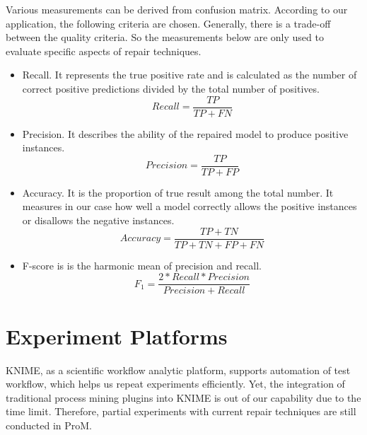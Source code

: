 Various measurements can be derived from confusion matrix. According to our application, the following criteria are chosen. Generally, there is a trade-off between the quality criteria. So the measurements below are only used to evaluate specific aspects of repair techniques.
\begin{itemize}
	\item Recall. It represents the true positive rate and is calculated as the number of correct positive predictions divided by the total number of positives.
	\[Recall = \frac{TP}{TP + FN}\]
	\item Precision. It describes the ability of the repaired model to produce positive instances.
	\[Precision = \frac{TP}{TP + FP }\]
	\item Accuracy. It is the proportion of true result among the total number. It  measures in our case how well a model correctly allows the positive instances or disallows the negative instances.
	\[Accuracy = \frac{TP+TN}{TP+TN+FP+FN}\]
	\item F-score is is the harmonic mean of precision and recall.
	\[F_1 = \frac{2*Recall*Precision}{Precision + Recall}\]
\end{itemize}

\section{Experiment Platforms}
KNIME, as a scientific workflow analytic platform, supports automation of test workflow, which helps us repeat experiments efficiently. Yet, the integration of traditional process mining plugins into KNIME is out of our capability due to the time limit. Therefore, partial experiments with current repair techniques are still conducted in ProM. 
